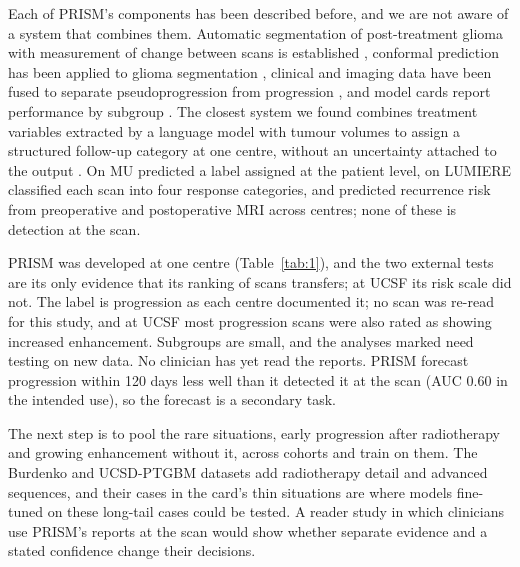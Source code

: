 \documentclass[largeformat]{interact} %
\begin{document}
Each of PRISM's components has been described before, and we are not aware of a system that combines them.
Automatic segmentation of post-treatment glioma with measurement of change between scans is established
\citep{rudie2022}, conformal prediction has been applied to glioma segmentation \citep{elyassirad2025}, clinical and
imaging data have been fused to separate pseudoprogression from progression \citep{gomaa2025}, and model cards report
performance by subgroup \citep{mitchell2019}. The closest system we found combines treatment variables extracted by a
language model with tumour volumes to assign a structured follow-up category at one centre, without an uncertainty
attached to the output \citep{jabal2026}. On MU \citet{christodoulou2026} predicted a label assigned at the patient level, on LUMIERE  classified each scan into four response categories, and
\citet{chen2026} predicted recurrence risk from preoperative and postoperative MRI across centres; none of these is
detection at the scan.

PRISM was developed at one centre (Table~\ref{tab:1}), and the two external tests are its only evidence that
its ranking of scans transfers; at UCSF its risk scale did not. The label is progression as each centre
documented it; no scan was re-read for this study, and at UCSF most progression scans were also rated as showing
increased enhancement. Subgroups are small, and the analyses marked \textdagger{} need testing on new data. No
clinician has yet read the reports. PRISM forecast progression within 120 days less well than it detected it at the
scan (AUC 0.60 in the intended use), so the forecast is a secondary task.

The next step is to pool the rare situations, early progression after radiotherapy and growing enhancement without
it, across cohorts and train on them. The Burdenko and UCSD-PTGBM datasets add radiotherapy detail and advanced
sequences, and their cases in the card's thin situations are where models fine-tuned on these long-tail cases could be
tested. A reader study in which clinicians use PRISM's
reports at the scan would show whether separate evidence and a stated confidence change their decisions.
\end{document}
